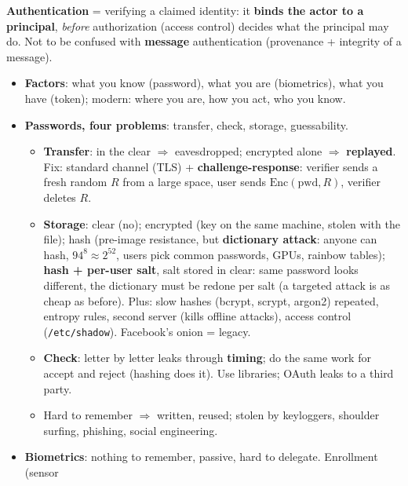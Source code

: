 \begin{recapbox}[title={Exam-ready recap --- Lecture 7: Authentication}]
\textbf{Authentication} = verifying a claimed identity: it \textbf{binds the actor to a principal},
\emph{before} authorization (access control) decides what the principal may do. Not to be
confused with \textbf{message} authentication (provenance + integrity of a message).
\begin{itemize}
  \item \textbf{Factors}: what you know (password), what you are (biometrics), what you have
        (token); modern: where you are, how you act, who you know.
  \item \textbf{Passwords, four problems}: transfer, check, storage, guessability.
        \begin{itemize}
          \item \textbf{Transfer}: in the clear $\Rightarrow$ eavesdropped; encrypted alone
                $\Rightarrow$ \textbf{replayed}. Fix: standard channel (TLS) +
                \textbf{challenge-response}: verifier sends a fresh random $R$ from a large space,
                user sends $\mathrm{Enc}(\text{pwd}, R)$, verifier deletes $R$.
          \item \textbf{Storage}: clear (no); encrypted (key on the same machine, stolen with the
                file); hash (pre-image resistance, but \textbf{dictionary attack}: anyone can hash,
                $94^8 \approx 2^{52}$, users pick common passwords, GPUs, rainbow tables);
                \textbf{hash + per-user salt}, salt stored in clear: same password looks
                different, the dictionary must be redone per salt (a targeted attack is as cheap
                as before). Plus: slow hashes (bcrypt, scrypt, argon2) repeated, entropy rules,
                second server (kills offline attacks), access control (\texttt{/etc/shadow}).
                Facebook's onion = legacy.
          \item \textbf{Check}: letter by letter leaks through \textbf{timing}; do the same work
                for accept and reject (hashing does it). Use libraries; OAuth leaks to a third
                party.
          \item Hard to remember $\Rightarrow$ written, reused; stolen by keyloggers, shoulder
                surfing, phishing, social engineering.
        \end{itemize}
  \item \textbf{Biometrics}: nothing to remember, passive, hard to delegate. Enrollment (sensor

\end{itemize}
\end{recapbox}

